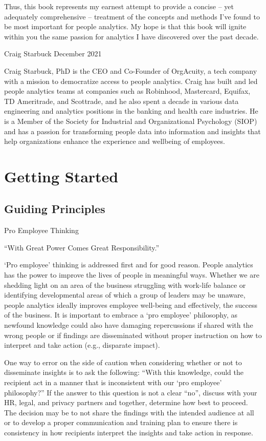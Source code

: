 \documentclass[]{book}
\begin{document}
Thus, this book represents my earnest attempt to provide a concise -- yet adequately comprehensive -- treatment of the concepts and methods I've found to be most important for people analytics. My hope is that this book will ignite within you the same passion for analytics I have discovered over the past decade.

Craig Starbuck
December 2021

Craig Starbuck, PhD is the CEO and Co-Founder of OrgAcuity, a tech company with a mission to democratize access to people analytics. Craig has built and led people analytics teams at companies such as Robinhood, Mastercard, Equifax, TD Ameritrade, and Scottrade, and he also spent a decade in various data engineering and analytics positions in the banking and health care industries. He is a Member of the Society for Industrial and Organizational Psychology (SIOP) and has a passion for transforming people data into information and insights that help organizations enhance the experience and wellbeing of employees.

\hypertarget{getting-started}{%
\chapter{Getting Started}\label{getting-started}}

\hypertarget{guiding-principles}{%
\section{Guiding Principles}\label{guiding-principles}}

 Pro Employee Thinking

``With Great Power Comes Great Responsibility.''

`Pro employee' thinking is addressed first and for good reason. People analytics has the power to improve the lives of people in meaningful ways. Whether we are shedding light on an area of the business struggling with work-life balance or identifying developmental areas of which a group of leaders may be unaware, people analytics ideally improves employee well-being and effectively, the success of the business. It is important to embrace a `pro employee' philosophy, as newfound knowledge could also have damaging repercussions if shared with the wrong people or if findings are disseminated without proper instruction on how to interpret and take action (e.g., disparate impact).

One way to error on the side of caution when considering whether or not to disseminate insights is to ask the following: ``With this knowledge, could the recipient act in a manner that is inconsistent with our `pro employee' philosophy?'' If the answer to this question is not a clear ``no'', discuss with your HR, legal, and privacy partners and together, determine how best to proceed. The decision may be to not share the findings with the intended audience at all or to develop a proper communication and training plan to ensure there is consistency in how recipients interpret the insights and take action in response.
\end{document}
